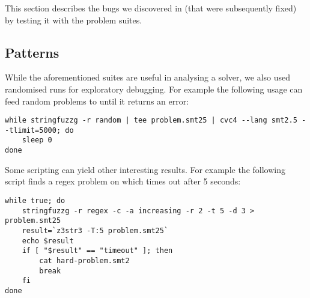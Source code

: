         This section describes the bugs we discovered in \us{} (that were subsequently fixed) by testing it with the \fuzzer{} problem suites.


    \subsection{Patterns}

        While the aforementioned suites are useful in analysing a solver, we also used randomised \fuzzer{} runs for exploratory debugging. For example the following usage can feed random problems to \cvc{} until it returns an error:

        {\scriptsize\begin{verbatim}
while stringfuzzg -r random | tee problem.smt25 | cvc4 --lang smt2.5 --tlimit=5000; do
    sleep 0
done\end{verbatim}}

        Some \unix{} scripting can yield other interesting results. For example the following script finds a regex problem on which \us{} times out after 5 seconds:

        {\scriptsize\begin{verbatim}while true; do
    stringfuzzg -r regex -c -a increasing -r 2 -t 5 -d 3 > problem.smt25
    result=`z3str3 -T:5 problem.smt25`
    echo $result
    if [ "$result" == "timeout" ]; then
        cat hard-problem.smt2
        break
    fi
done\end{verbatim}}
